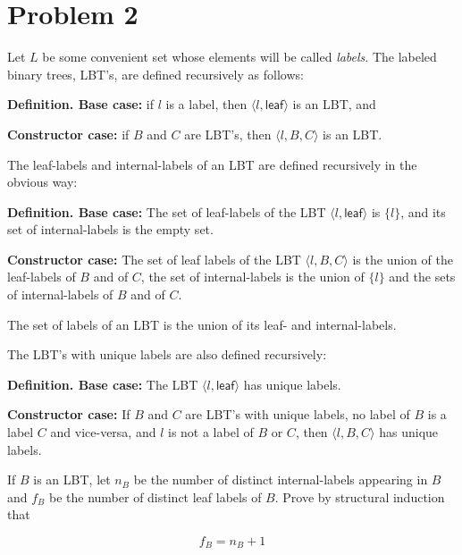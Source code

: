 \documentclass[14pt]{extarticle}
\begin{document}
\section{Problem 2}
Let $L$ be some convenient set whose elements will be called \textit{labels}. The labeled binary trees, LBT’s, are defined recursively as follows:

\textbf{Definition. Base case:} if $l$ is a label, then $\langle l, \mathsf{leaf}\rangle$ is an LBT, and

\textbf{Constructor case:} if $B$ and $C$ are LBT’s, then $\langle l, B, C \rangle$ is an LBT.

The leaf-labels and internal-labels of an LBT are defined recursively in the obvious way:

\textbf{Definition. Base case:} The set of leaf-labels of the LBT $\langle l, \mathsf{leaf} \rangle$ is $\{l\}$, and its set of internal-labels is the empty set.

\textbf{Constructor case:} The set of leaf labels of the LBT $\langle l, B, C \rangle$ is the union of the leaf-labels of $B$ and of $C$,
the set of internal-labels is the union of $\{l\}$ and the sets of internal-labels of $B$ and of $C$.

The set of labels of an LBT is the union of its leaf- and internal-labels.

The LBT’s with unique labels are also defined recursively:

\textbf{Definition. Base case:} The LBT $\langle l, \mathsf{leaf}\rangle$ has unique labels.

\textbf{Constructor case:} If $B$ and $C$ are LBT’s with unique labels, no label of $B$ is a label $C$ and vice-versa, and $l$ is not a label of $B$ or $C$, then $\langle l, B, C\rangle$ has unique labels.

If $B$ is an LBT, let $n_B$ be the number of distinct internal-labels appearing in $B$ and $f_B$ be the number of distinct leaf labels of $B$. Prove by structural induction that

$$
f_B = n_B + 1
$$
\end{document}
